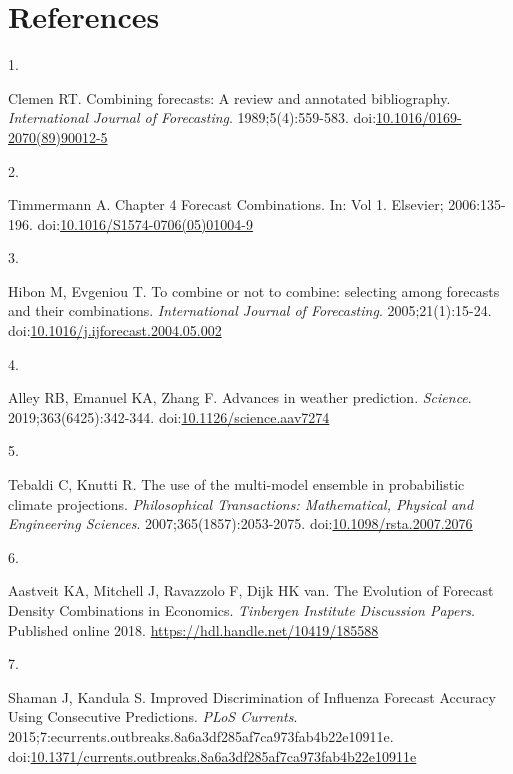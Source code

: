 \documentclass[
  letterpaper,
  DIV=11,
  numbers=noendperiod]{scrartcl}
\newlength{\cslhangindent}
\newlength{\csllabelwidth}
\newenvironment{CSLReferences}[2] %
 {\begin{list}{}{%
  \setlength{\itemindent}{0pt}
  \setlength{\leftmargin}{0pt}
  \setlength{\parsep}{0pt}
  \ifodd #1
   \setlength{\leftmargin}{\cslhangindent}
   \setlength{\itemindent}{-1\cslhangindent}
  \fi
  \setlength{\itemsep}{#2\baselineskip}}}
 {\end{list}}
\newcommand{\CSLLeftMargin}[1]{\parbox[t]{\csllabelwidth}{\strut#1\strut}}
\newcommand{\CSLRightInline}[1]{\parbox[t]{\linewidth - \csllabelwidth}{\strut#1\strut}}
\begin{document}
\section*{References}\label{references}

\label{refs}
\begin{CSLReferences}{0}{1}
\CSLLeftMargin{1. }%
\CSLRightInline{Clemen RT. Combining forecasts: A review and annotated
bibliography. \emph{International Journal of Forecasting}.
1989;5(4):559-583.
doi:\href{https://doi.org/10.1016/0169-2070(89)90012-5}{10.1016/0169-2070(89)90012-5}}

\CSLLeftMargin{2. }%
\CSLRightInline{Timmermann A. Chapter 4 Forecast Combinations. In: Vol
1. Elsevier; 2006:135-196.
doi:\href{https://doi.org/10.1016/S1574-0706(05)01004-9}{10.1016/S1574-0706(05)01004-9}}

\CSLLeftMargin{3. }%
\CSLRightInline{Hibon M, Evgeniou T. To combine or not to combine:
selecting among forecasts and their combinations. \emph{International
Journal of Forecasting}. 2005;21(1):15-24.
doi:\href{https://doi.org/10.1016/j.ijforecast.2004.05.002}{10.1016/j.ijforecast.2004.05.002}}

\CSLLeftMargin{4. }%
\CSLRightInline{Alley RB, Emanuel KA, Zhang F. Advances in weather
prediction. \emph{Science}. 2019;363(6425):342-344.
doi:\href{https://doi.org/10.1126/science.aav7274}{10.1126/science.aav7274}}

\CSLLeftMargin{5. }%
\CSLRightInline{Tebaldi C, Knutti R. The use of the multi-model ensemble
in probabilistic climate projections. \emph{Philosophical Transactions:
Mathematical, Physical and Engineering Sciences}.
2007;365(1857):2053-2075.
doi:\href{https://doi.org/10.1098/rsta.2007.2076}{10.1098/rsta.2007.2076}}

\CSLLeftMargin{6. }%
\CSLRightInline{Aastveit KA, Mitchell J, Ravazzolo F, Dijk HK van. The
Evolution of Forecast Density Combinations in Economics. \emph{Tinbergen
Institute Discussion Papers}. Published online 2018.
\url{https://hdl.handle.net/10419/185588}}

\CSLLeftMargin{7. }%
\CSLRightInline{Shaman J, Kandula S. Improved {Discrimination} of
{Influenza} {Forecast} {Accuracy} {Using} {Consecutive} {Predictions}.
\emph{PLoS Currents}.
2015;7:ecurrents.outbreaks.8a6a3df285af7ca973fab4b22e10911e.
doi:\href{https://doi.org/10.1371/currents.outbreaks.8a6a3df285af7ca973fab4b22e10911e}{10.1371/currents.outbreaks.8a6a3df285af7ca973fab4b22e10911e}}


\end{CSLReferences}
\end{document}
